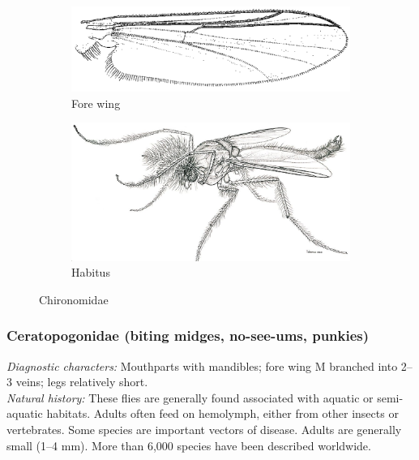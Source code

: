\documentclass[letterpaper, 11pt]{article}
\begin{document}
\begin{figure}[ht!]
    \centering
    \begin{subfigure}[ht!]{0.45\textwidth}
        \includegraphics[width=\textwidth]{ChironomidWing}
        \caption{Fore wing \citep[][Fig. 29.9]{mcalpine1981manual}}
        \label{fig:chiron1}
    \end{subfigure}
    \qquad 
    \begin{subfigure}[ht!]{0.45\textwidth}
        \includegraphics[width=\textwidth]{ChironomidHabitus}
        \caption{Habitus \citep[][Fig. 29.1]{mcalpine1981manual}}
        \label{fig:chiron2}
    \end{subfigure}
    \caption{Chironomidae}\label{fig:chironomids}
\end{figure}

\subsubsection{Ceratopogonidae (biting midges, no-see-ums, punkies)}
\noindent{}\textit{Diagnostic characters:} Mouthparts with mandibles; fore wing M branched into 2--3 veins; legs relatively short. \\%

\noindent{}\textit{Natural history:} These flies are generally found associated with aquatic or semi-aquatic habitats. Adults often feed on hemolymph, either from other insects or vertebrates. Some species are important vectors of disease. Adults are generally small (1--4 mm). More than 6,000 species have been described worldwide.  
\end{document}
